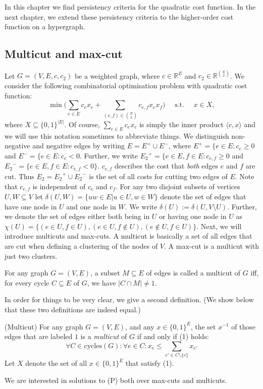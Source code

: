 In this chapter we find persistency criteria for the quadratic cost function. In the next chapter, we extend these persistency criteria to the higher-order cost function on a hypergraph. 

\subsection{Multicut and max-cut}
Let $G=(V,E,c,c_2)$ be a weighted graph, where $c \in {\mathbb{R}}^E$ and $c_2 \in {\mathbb{R}}^{\binom{E}{2}}$. 
We consider the following combinatorial optimisation problem with quadratic cost function: 
\begin{equation}
\tag{P}
 \min \Big(\sum_{e \in E} c_e x_e + \sum_{(e,f) \in {E \choose 2}} c_{e,f} x_e x_f \Big)  \quad \text{ s.t. } \quad x \in X,
\end{equation}
where $X \subseteq \{0,1\}^{|E|}$. Of course, $\sum_{e \in E} c_e x_e$ is simply the inner product $\langle c, x \rangle$ and we will use this notation sometimes to abbreviate things. 
We distinguish non-negative and negative edges by writing $E=E^+ \cup E^-$, where $E^+= \{e \in E: c_e \geq 0$ and $E^-=\{e \in E: c_e <0$. Further, we write ${E_2}^+=\{ e \in E, f \in E: c_{e,f} \geq 0$ and ${E_2}^- = \{e \in E, f \in E: c_{e,f} < 0\}$. $c_{e,f}$ describes the cost that \textit{both} edges $e$ and $f$ are cut. Thus $E_2={E_2}^+\cup{E_2}^- $ is the set of all costs for cutting two edges of $E$. Note that $c_{e,f}$ is independent of $c_e$ and $c_f$. 
For any two disjoint subsets of vertices $U,W \subseteq V$ let $\delta(U,W)= \{uw \in E| u \in U, w \in W\}$ denote the set of edges that have one node in $U$ and one node in $W$. We write $\delta(U):=\delta(U,V \setminus U)$. Further, we denote the set of edges either both being in $U$ or having one node in $U$ as $\chi(U)= \{(e \in U, f \in U), (e \in U, f \notin U), (e \notin U, f \in U) \}$.
Next, we will introduce multicuts and max-cuts. A multicut is basically a set of all edges that are cut when defining a clustering of the nodes of $V$. A max-cut is a multicut with just two clusters. 
\begin{definition}
For any graph $G=(V,E)$, a subset $M \subseteq E$ of edges is called a multicut of $G$ iff, for every cycle $C \subseteq E$ of $G$, we have $|C \cap M| \neq 1$.
\end{definition}
In order for things to be very clear, we give a second definition. (We show below that these two definitions are indeed equal.)
\begin{definition}{(Multicut)}
For any graph $G=(V,E)$, and any $x \in \{0,1\}^E$, the set $x^{-1}$ of those edges that are labeled $1$ is a \textit{multicut} of $G$ if and only if (1) holds: 
\begin{equation}
    \forall C \in \text{cycles}(G): \forall e \in C: x_e \leq \sum_{e' \in C \setminus \{e \}} x_{e'} 
\end{equation} Let $X$ denote the set of all $x \in \{0,1\}^E$ that satisfy (1).
\end{definition}
We are interested in solutions to (P) both over max-cuts and multicuts. 

